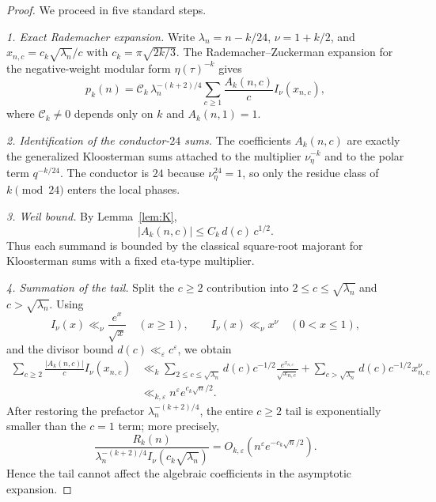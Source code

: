 \documentclass[11pt,a4paper]{article}
\begin{document}
\begin{proof}
We proceed in five standard steps.

\smallskip
\noindent\emph{1. Exact Rademacher expansion.}
Write $\lambda_n = n-k/24$, $\nu = 1 + k/2$, and $x_{n,c}=c_k\sqrt{\lambda_n}/c$ with $c_k=\pi\sqrt{2k/3}$. The Rademacher--Zuckerman expansion for the negative-weight modular form $\eta(\tau)^{-k}$ gives
\[
  p_k(n)
  = \mathcal{C}_k\,\lambda_n^{-(k+2)/4}
    \sum_{c\ge1} \frac{A_k(n,c)}{c}
    I_{\nu}(x_{n,c}),
\]
where $\mathcal{C}_k\neq 0$ depends only on $k$ and $A_k(n,1)=1$.

\smallskip
\noindent\emph{2. Identification of the conductor-$24$ sums.}
The coefficients $A_k(n,c)$ are exactly the generalized Kloosterman sums attached to the multiplier $\nu_{\eta}^{-k}$ and to the polar term $q^{-k/24}$. The conductor is $24$ because $\nu_{\eta}^{24}=1$, so only the residue class of $k\pmod{24}$ enters the local phases.

\smallskip
\noindent\emph{3. Weil bound.}
By Lemma~\ref{lem:K},
\[
  |A_k(n,c)| \le C_k\,d(c)\,c^{1/2}.
\]
Thus each summand is bounded by the classical square-root majorant for Kloosterman sums with a fixed eta-type multiplier.

\smallskip
\noindent\emph{4. Summation of the tail.}
Split the $c\ge2$ contribution into $2\le c\le \sqrt{\lambda_n}$ and $c>\sqrt{\lambda_n}$. Using
\[
  I_{\nu}(x)\ll_{\nu} \frac{e^x}{\sqrt{x}} \quad (x\ge1),
  \qquad
  I_{\nu}(x)\ll_{\nu} x^{\nu} \quad (0<x\le1),
\]
and the divisor bound $d(c)\ll_{\varepsilon} c^{\varepsilon}$, we obtain
\[
\begin{aligned}
  \sum_{c\ge2}\frac{|A_k(n,c)|}{c}I_{\nu}(x_{n,c})
  &\ll_k \sum_{2\le c\le \sqrt{\lambda_n}} d(c)c^{-1/2}\frac{e^{x_{n,c}}}{\sqrt{x_{n,c}}}
   + \sum_{c>\sqrt{\lambda_n}} d(c)c^{-1/2}x_{n,c}^{\nu} \\
  &\ll_{k,\varepsilon} n^{\varepsilon}e^{c_k\sqrt n/2}.
\end{aligned}
\]
After restoring the prefactor $\lambda_n^{-(k+2)/4}$, the entire $c\ge2$ tail is exponentially smaller than the $c=1$ term; more precisely,
\[
  \frac{R_k(n)}{\lambda_n^{-(k+2)/4}I_{\nu}(c_k\sqrt{\lambda_n})}
  = O_{k,\varepsilon}\!\left(n^{\varepsilon}e^{-c_k\sqrt n/2}\right).
\]
Hence the tail cannot affect the algebraic coefficients in the asymptotic expansion.


\end{proof}
\end{document}
